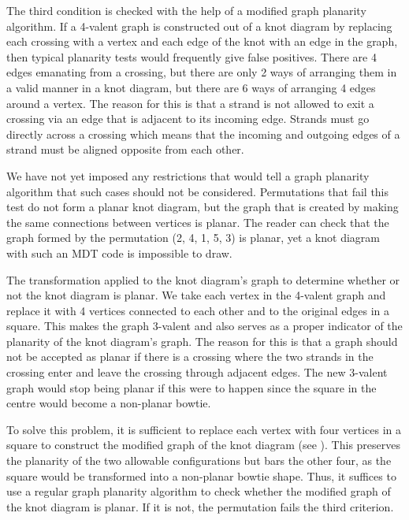 \begin{paper}
The third condition is checked with the help of a modified graph planarity
algorithm.
If a 4-valent graph is constructed out of a knot diagram by replacing each
crossing with a vertex and each edge of the knot with an edge in the graph, then
typical planarity tests would frequently give false positives.
There are 4 edges emanating from a crossing, but there are only 2 ways of
arranging them in a valid manner in a knot diagram, but there are 6 ways of
arranging 4 edges around a vertex.
The reason for this is that a strand is not allowed to exit a crossing via an
edge that is adjacent to its incoming edge.
Strands must go directly across a crossing which means that the incoming and
outgoing edges of a strand must be aligned opposite from each other.

We have not yet imposed any restrictions that would tell a graph planarity
algorithm that such cases should not be considered.
Permutations that fail this test do not form a planar knot diagram, but the
graph that is created by making the same connections between vertices is
planar.
The reader can check that the graph formed by the permutation (2, 4, 1, 5, 3) is
planar, yet a knot diagram with such an MDT code is impossible to draw.

{The transformation applied to the knot diagram's graph to determine whether or
not the knot diagram is planar.
We take each vertex in the 4-valent graph and replace it with 4 vertices
connected to each other and to the original edges in a square.
This makes the graph 3-valent and also serves as a proper indicator of the
planarity of the knot diagram's graph.
The reason for this is that a graph should not be accepted as planar if there is
a crossing where the two strands in the crossing enter and leave the crossing
through adjacent edges.
The new 3-valent graph would stop being planar if this were to happen since the
square in the centre would become a non-planar bowtie.}

To solve this problem, it is sufficient to replace each vertex with four
vertices in a square to construct the modified graph of the knot diagram (see
\figGraph).
This preserves the planarity of the two allowable configurations but bars the
other four, as the square would be transformed into a non-planar bowtie shape.
Thus, it suffices to use a regular graph planarity algorithm to check whether
the modified graph of the knot diagram is planar.
If it is not, the permutation fails the third criterion.



\end{paper}
